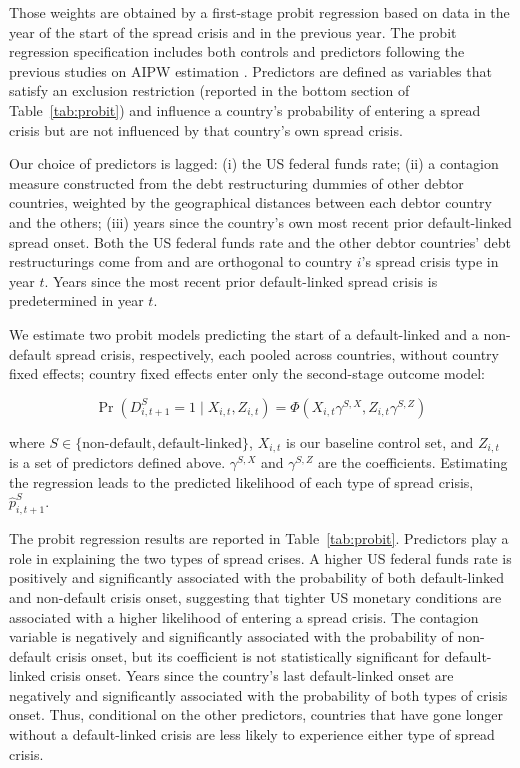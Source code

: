 \documentclass[12pt]{article}
\begin{document}
Those weights are obtained by a first-stage probit regression based on
data in the year of the start of the spread crisis and in the previous
year. The probit regression specification includes both controls and
predictors following the previous studies on AIPW estimation
\citep{jorda2016time,jorda2020effects}. Predictors are defined as variables
that satisfy an exclusion restriction (reported in the bottom section of
Table~\ref{tab:probit}) and influence a country's probability of entering
a spread crisis but are not influenced by that country's own spread
crisis.

Our choice of predictors is lagged: (i) the US federal funds rate; (ii) a
contagion measure constructed from the debt restructuring dummies of
other debtor countries, weighted by the geographical distances between
each debtor country and the others; (iii) years since the country's own
most recent prior default-linked spread onset. Both the US federal funds
rate and the other debtor countries' debt restructurings come from
\citet{asonuma2024costs} and are orthogonal to country $i$'s spread crisis
type in year $t$. Years since the most recent prior default-linked spread
crisis is predetermined in year $t$.

We estimate two probit models predicting the start of a default-linked
and a non-default spread crisis, respectively, each pooled across
countries, without country fixed effects; country fixed effects enter
only the second-stage outcome model:

\begin{equation}
\label{eq:3}
\Pr\!\left(D_{i,t+1}^S = 1 \mid X_{i,t}, Z_{i,t}\right) = \Phi\!\left(X_{i,t}\gamma^{S,X}, Z_{i,t}\gamma^{S,Z}\right)
\end{equation}

\noindent where $S \in \{\text{non-default}, \text{default-linked}\}$,
$X_{i,t}$ is our baseline control set, and $Z_{i,t}$ is a set of
predictors defined above. $\gamma^{S,X}$ and $\gamma^{S,Z}$ are the
coefficients. Estimating the regression leads to the predicted
likelihood of each type of spread crisis, $\widehat{p}_{i,t+1}^S$.


The probit regression results are reported in Table~\ref{tab:probit}.
Predictors play a role in explaining the two types of spread crises. A
higher US federal funds rate is positively and significantly associated
with the probability of both default-linked and non-default crisis
onset, suggesting that tighter US monetary conditions are associated with
a higher likelihood of entering a spread crisis. The contagion variable is
negatively and significantly associated with the probability of
non-default crisis onset, but its coefficient is not statistically
significant for default-linked crisis onset. Years since the country's
last default-linked onset are negatively and significantly associated
with the probability of both types of crisis onset. Thus, conditional on
the other predictors, countries that have gone longer without a
default-linked crisis are less likely to experience either type of spread
crisis.
\end{document}
